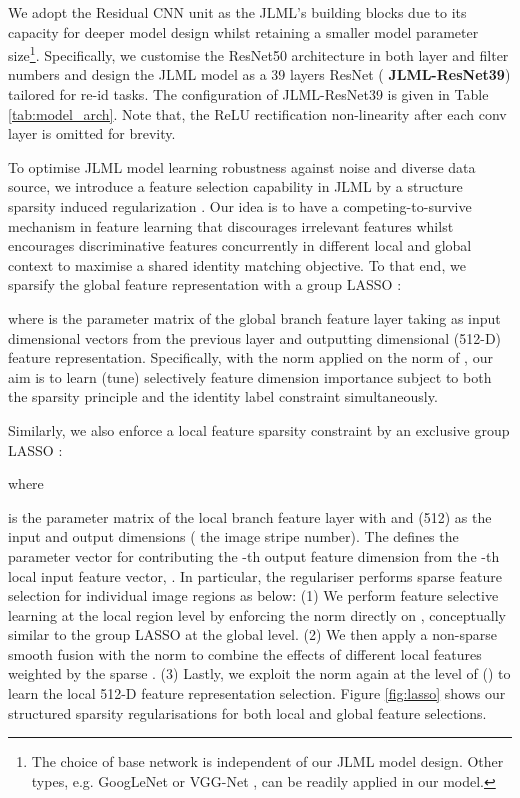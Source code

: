 \documentclass{article}
\begin{document}
\vspace{0.1cm}
We adopt the Residual CNN unit \cite{he2016deep} as the JLML's building blocks 
due to its capacity for deeper model design whilst retaining a smaller
model parameter size\footnote{The choice of base network
is independent of our JLML model design. Other types, e.g. 
GoogLeNet \cite{szegedy2015going} or VGG-Net \cite{simonyan2014very},
can be readily applied in our model. 
}.
Specifically, we customise the ResNet50 architecture in both layer and
filter numbers and design the JLML model as a 39 layers ResNet ({\bf
JLML-ResNet39}) tailored for re-id tasks. 
The configuration of JLML-ResNet39 is given in Table \ref{tab:model_arch}. 
Note that, the ReLU rectification non-linearity \cite{krizhevsky2012imagenet} 
after each conv layer is omitted for brevity.



\vspace{0.1cm}
To optimise JLML model learning robustness against noise and diverse
data source, we introduce a feature selection capability in JLML by 
a structure sparsity induced
regularization \cite{kong2014exclusive,wang2013multi}. 
Our idea is to have a competing-to-survive mechanism in feature
learning that discourages irrelevant features whilst encourages
discriminative features concurrently in different local and
global context to maximise a shared identity matching objective.
To that end, we sparsify the global feature representation 
with a group LASSO \cite{wang2013multi}:

where  is the parameter matrix of the global branch 
feature layer taking 
as input  dimensional vectors from the previous layer
and outputting  dimensional (512-D) feature representation.
Specifically, with the  norm applied on the  norm of , 
our aim is to learn (tune) selectively feature dimension
importance subject to both the sparsity principle and the identity label
constraint simultaneously.

Similarly, we also enforce a local feature sparsity constraint by 
an exclusive group LASSO \cite{kong2014exclusive}:

where



is the parameter matrix of the local branch feature layer
with  and  (512) as the input and output dimensions
( the image stripe number).
The  defines
the parameter vector for contributing the -th output feature dimension
from the -th local input feature vector, . 
In particular, the  regulariser performs sparse feature selection 
for individual image regions as below:
(1) We perform feature selective learning at the local region level
by enforcing the  norm directly on ,
conceptually similar to the group LASSO at the global level.
(2) We then apply a non-sparse smooth fusion with the  norm
to combine the effects of different local features
weighted by the sparse . 
(3) Lastly, we exploit the  norm again
at the level of  ()
to learn the local 512-D feature representation selection.
Figure \ref{fig:lasso} shows our structured sparsity
regularisations for both local and global feature selections.
\end{document}
